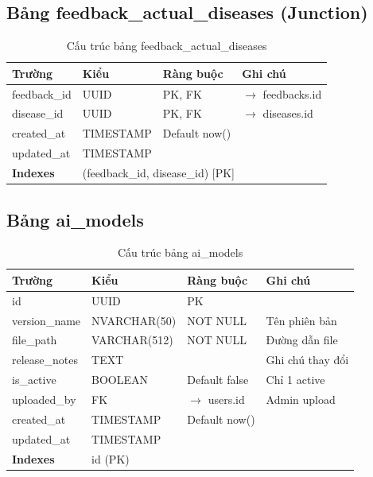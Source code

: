 \documentclass[12pt,a4paper]{article}
\begin{document}
\subsection{Bảng feedback\_actual\_diseases (Junction)}
\begin{longtable}{|l|l|l|p{5.5cm}|}
    \caption{Cấu trúc bảng feedback\_actual\_diseases}                                \\
    \hline
    \rowcolor{headerblue}
    \textbf{Trường} & \textbf{Kiểu} & \textbf{Ràng buộc} & \textbf{Ghi chú}           \\
    \hline
    feedback\_id    & UUID          & PK, FK             & $\rightarrow$ feedbacks.id \\
    \hline
    disease\_id     & UUID          & PK, FK             & $\rightarrow$ diseases.id  \\
    \hline
    created\_at     & TIMESTAMP     & Default now()      &                            \\
    \hline
    updated\_at     & TIMESTAMP     &                    &                            \\
    \hline
    \rowcolor{headerblue}
    \textbf{Indexes} & \multicolumn{3}{l|}{(feedback\_id, disease\_id) [PK]}          \\
    \hline
\end{longtable}

\subsection{Bảng ai\_models}
\begin{longtable}{|l|l|l|p{5.5cm}|}
    \caption{Cấu trúc bảng ai\_models}                                          \\
    \hline
    \rowcolor{headerblue}
    \textbf{Trường} & \textbf{Kiểu} & \textbf{Ràng buộc}     & \textbf{Ghi chú} \\
    \hline
    id              & UUID          & PK                     &                  \\
    \hline
    version\_name   & NVARCHAR(50)  & NOT NULL               & Tên phiên bản    \\
    \hline
    file\_path      & VARCHAR(512)  & NOT NULL               & Đường dẫn file   \\
    \hline
    release\_notes  & TEXT          &                        & Ghi chú thay đổi \\
    \hline
    is\_active      & BOOLEAN       & Default false          & Chỉ 1 active     \\
    \hline
    uploaded\_by    & FK            & $\rightarrow$ users.id & Admin upload     \\
    \hline
    created\_at     & TIMESTAMP     & Default now()          &                  \\
    \hline
    updated\_at     & TIMESTAMP     &                        &                  \\
    \hline
    \rowcolor{headerblue}
    \textbf{Indexes} & \multicolumn{3}{l|}{id (PK)}                                \\
    \hline
\end{longtable}
\end{document}

